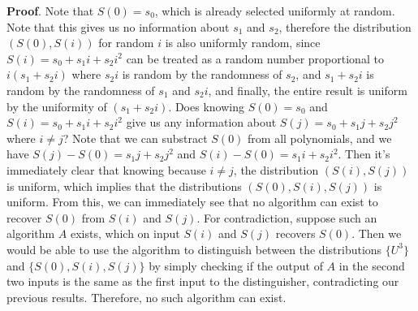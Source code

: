 \documentclass{article}
\begin{document}
\begin{enumerate}
\begin{enumerate}[,label=\alph*.]
\begin{mdbmarginx}{1ex}{0pt}{1ex}{0pt}%
\noindent{}\textbf{Proof}.  Note that $S(0) = s_0$, which is already selected uniformly at random. Note that this
gives us no information about $s_1$ and $s_2$, therefore the distribution $(S(0), S(i))$ for
random $i$ is also uniformly random, since $S(i) = s_0 + s_1i + s_2 i^2$ can be treated as a 
random number proportional to $i(s_1 + s_2 i)$ where $s_2 i$ is random by the randomness
of $s_2$, and $s_1 + s_2 i$ is random by the randomness of $s_1$ and $s_2i$, and finally,
the entire result is uniform by the uniformity of $(s_1 + s_2 i)$. Does knowing
$S(0) = s_0$ and $S(i) = s_0 + s_1 i  + s_2i^2$ give us any information about
$S(j) = s_0 +s_1 j + s_2j^2$ where $i \neq j$? Note that we can substract $S(0)$ from
all polynomials, and we have $S(j) - S(0) = s_1j + s_2j^2$ and $S(i) - S(0) = s_1i + s_2i^2$. 
Then it's immediately clear that knowing because $i \neq j$, the distribution $(S(i), S(j))$ is
uniform, which implies that the distributions $(S(0),S(i),S(j))$ is uniform. From this,
we can immediately see that no algorithm can exist to recover $S(0)$ from $S(i)$ and $S(j)$.
For contradiction, suppose such an algorithm $A$ exists, which on input $S(i)$ and $S(j)$ 
recovers $S(0)$. Then we would be able to use the algorithm to distinguish between the
distributions $\{U^3\}$ and $\{S(0),S(i),S(j) \}$ by simply checking if the output of $A$ 
in the second two inputs is the same as the first input to the distinguisher, contradicting
our previous results. Therefore, no such algorithm can exist. 
\mdfloatright{\ensuremath{\Box}}%
\end{mdbmarginx}%


\end{enumerate}
\end{enumerate}
\end{document}
